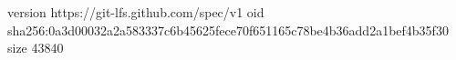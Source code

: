 version https://git-lfs.github.com/spec/v1
oid sha256:0a3d00032a2a583337c6b45625fece70f651165c78be4b36add2a1bef4b35f30
size 43840
